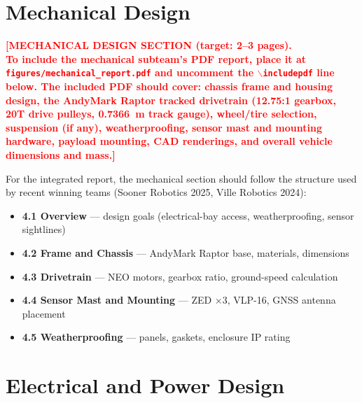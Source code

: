 \documentclass[11pt, letterpaper]{article}
\newcommand{\placeholder}[1]{\textcolor{red}{\textbf{[#1]}}}
\begin{document}
\section{Mechanical Design}

\placeholder{MECHANICAL DESIGN SECTION (target: 2--3 pages).\\[0.5em]
To include the mechanical subteam's PDF report, place it at\\
\texttt{figures/mechanical\_report.pdf} and uncomment the \texttt{$\backslash$includepdf} line below.
The included PDF should cover: chassis frame and housing design, the AndyMark Raptor
tracked drivetrain (12.75:1 gearbox, 20T drive pulleys, 0.7366~m track gauge), wheel/tire
selection, suspension (if any), weatherproofing, sensor mast and mounting hardware,
payload mounting, CAD renderings, and overall vehicle dimensions and mass.}

% 

\vspace{0.5em}

For the integrated report, the mechanical section should follow the structure used by recent
winning teams (Sooner Robotics 2025, Ville Robotics 2024):
\begin{itemize}
    \item \textbf{4.1 Overview} --- design goals (electrical-bay access, weatherproofing, sensor sightlines)
    \item \textbf{4.2 Frame and Chassis} --- AndyMark Raptor base, materials, dimensions
    \item \textbf{4.3 Drivetrain} --- NEO motors, gearbox ratio, ground-speed calculation
    \item \textbf{4.4 Sensor Mast and Mounting} --- ZED $\times$3, VLP-16, GNSS antenna placement
    \item \textbf{4.5 Weatherproofing} --- panels, gaskets, enclosure IP rating
\end{itemize}

\section{Electrical and Power Design}
\end{document}
